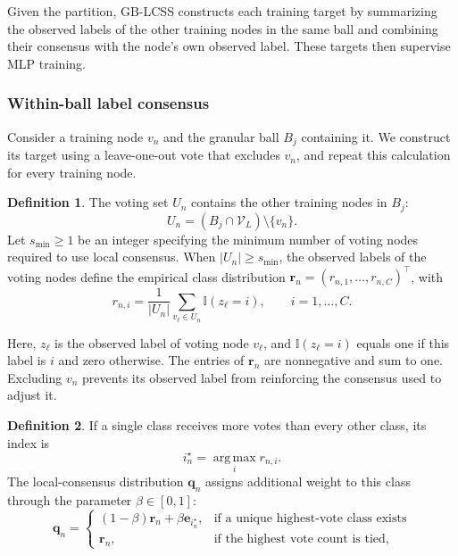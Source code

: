 \documentclass[a4paper,fleqn]{cas-sc}
\theoremstyle{definition}
\newtheorem{definition}{Definition}
\theoremstyle{plain}
\begin{document}
Given the partition, GB-LCSS constructs each training target by summarizing the observed labels of the other training nodes in the same ball and combining their consensus with the node's own observed label. These targets then supervise MLP training.

\subsubsection{Within-ball label consensus}\label{sec:3.3.1}

Consider a training node \(v_n\) and the granular ball \(B_j\) containing it. We construct its target using a leave-one-out vote that excludes \(v_n\), and repeat this calculation for every training node.

\begin{definition}
The voting set \(U_n\) contains the other training nodes in \(B_j\):
\begin{equation}\label{eq:7}
U_n=(B_j\cap\mathcal V_L)\setminus\{v_n\}.
\end{equation}
Let \(s_{\min}\geq1\) be an integer specifying the minimum number of voting nodes required to use local consensus. When \(|U_n|\geq s_{\min}\), the observed labels of the voting nodes define the empirical class distribution \(\mathbf r_n=(r_{n,1},\ldots,r_{n,C})^\top\), with
\begin{equation}\label{eq:8}
r_{n,i}=\frac{1}{|U_n|}\sum_{v_\ell\in U_n}\mathbb I(z_\ell=i),
\qquad i=1,\ldots,C.
\end{equation}
\end{definition}

Here, \(z_\ell\) is the observed label of voting node \(v_\ell\), and \(\mathbb I(z_\ell=i)\) equals one if this label is \(i\) and zero otherwise. The entries of \(\mathbf r_n\) are nonnegative and sum to one. Excluding \(v_n\) prevents its observed label from reinforcing the consensus used to adjust it.

\begin{definition}
If a single class receives more votes than every other class, its index is
\begin{equation}\label{eq:9}
i_n^\star=\operatorname*{arg\,max}_i r_{n,i}.
\end{equation}
The local-consensus distribution \(\mathbf q_n\) assigns additional weight to this class through the parameter \(\beta\in[0,1]\):
\begin{equation}\label{eq:10}
\mathbf q_n=
\begin{cases}
(1-\beta)\mathbf r_n+\beta\mathbf e_{i_n^\star},&\text{if a unique highest-vote class exists}\\
\mathbf r_n,&\text{if the highest vote count is tied},
\end{cases}
\end{equation}
\end{definition}
\end{document}
